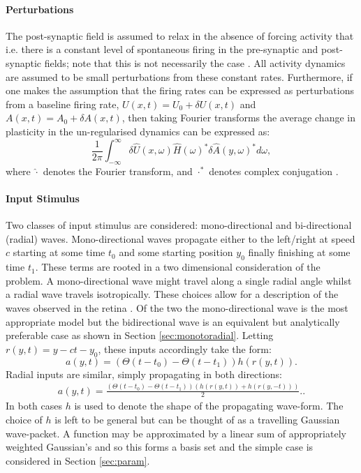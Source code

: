 \paragraph{Perturbations}
The post-synaptic field is assumed to relax in the absence of forcing activity that i.e. there is a constant level of spontaneous firing in the pre-synaptic and post-synaptic fields; note that this is not necessarily the case \cite{Coombes2005-mt}. All activity dynamics are assumed to be small perturbations from these constant rates. Furthermore, if one makes the assumption that the firing rates can be expressed as perturbations from a baseline firing rate,  $U(x,t) = U_0 + \delta U(x,t)$ and $A(x,t) = A_0 + \delta A(x,t)$, then taking Fourier transforms the average change in plasticity in the un-regularised dynamics can be expressed as:
\begin{equation}
	\frac{1}{2\pi}  \int_{-\infty}^{\infty} \delta \hat{U}(x,\omega) \hat{H}(\omega)^* \delta\hat{A}(y,\omega)^*d\omega,
\end{equation}
where $\hat{\cdot}$ denotes the Fourier transform, and $\cdot^*$ denotes complex conjugation \cite{Robinson2011-ve}. 

\paragraph{Input Stimulus}
Two classes of input stimulus are considered: mono-directional and bi-directional (radial) waves. Mono-directional waves propagate either to the left/right at speed $c$ starting at some time $t_0$ and some starting position $y_0$ finally finishing at some time $t_1$. These terms are rooted in a two dimensional consideration of the problem. A mono-directional wave might travel along a single radial angle whilst a radial wave travels isotropically. { These choices allow for a description of the waves observed in the retina  \cite{Meister1991-mu, Stafford2009, Ackman2012-uu}. Of the two the mono-directional wave is the most appropriate model but the bidirectional wave is an equivalent but analytically preferable case as shown in Section \ref{sec:monotoradial}}. Letting $r(y,t)=y-ct-y_0$, these inputs accordingly take the form:
\begin{equation}
	a(y,t) = (\Theta(t-t_0)-\Theta(t-t_1))h(r(y,t)). \label{wave:plane}
\end{equation}
Radial inputs are similar, simply propagating in both directions:
\begin{align}
	a(y,t) = \frac{(\Theta(t-t_0)-\Theta(t-t_1))(h(r(y,t))+h(r(y,-t)))}{2}. 
	\label{wave:radial}.
\end{align}
In both cases $h$ is used to denote the shape of the propagating wave-form. The choice of $h$ is left to be general but can be thought of as a travelling Gaussian wave-packet. A function may be approximated by a linear sum of appropriately weighted Gaussian's and so this forms a basis set and the simple case is considered in Section \ref{sec:param}.
